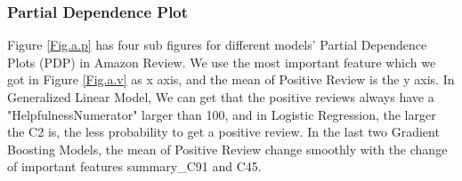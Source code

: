 \documentclass{article}
\begin{document}
\subsubsection{Partial Dependence Plot}
Figure \ref{Fig.a.p} has four sub figures for different models' Partial Dependence Plots (PDP) in Amazon Review. We use the most important feature which we got in Figure \ref{Fig.a.v} as x axis, and the mean of Positive Review is the y axis. In Generalized Linear Model, We can get that the positive reviews always have a "HelpfulnessNumerator" larger than 100, and in Logistic Regression, the larger the C2 is, the less probability to get a positive review. In the last two Gradient Boosting Models, the mean of Positive Review change smoothly with the change of important features summary\_C91 and C45.

\begin{figure}[H]
\centering
{}
\end{figure}
\end{document}
